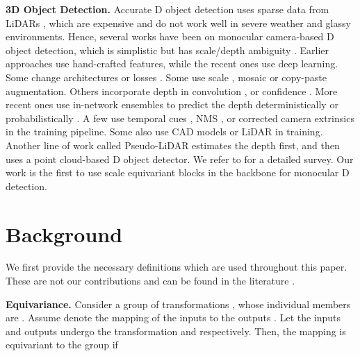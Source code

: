 \documentclass[runningheads]{llncs}
\newcommand{\threeD}{D}
\newcommand{\lidar}{LiDAR}
\newcommand{\equivariant} {equivariant}
\newcommand{\Equivariance}{Equivariance}
\newcommand{\scaleEquivariant} {scale \equivariant}
\newcommand{\pseudoLidar}{Pseudo-{\lidar}}
\newcommand{\noIndentHeading}[1]{\noindent\textbf{#1}}
\begin{document}
\noIndentHeading{3D Object Detection.}
        Accurate \threeD{} object detection uses sparse data from \lidar{}s \cite{shi2019pointrcnn}, which are expensive and do not work well in severe weather \cite{tang2020center3d} and glassy environments. 
        Hence, several works have been on monocular camera-based \threeD{} object detection, which is simplistic  but has scale/depth ambiguity \cite{tang2020center3d}.
        Earlier approaches \cite{payet2011contours, fidler20123d, pepik2015multi, chen2016monocular} use hand-crafted features, while the recent ones use deep learning.
        Some change architectures \cite{liu2019deep,li2020rtm3d,tang2020center3d,liu2022learning} or losses \cite{brazil2019m3d,chen2020monopair}. 
        Some use scale \cite{simonelli2020towards, lu2021geometry}, mosaic \cite{sugirtha2021exploring} or copy-paste \cite{lian2021geometry} augmentation.
        Others incorporate depth in convolution \cite{brazil2019m3d, ding2020learning}, or confidence \cite{kumar2020luvli, liu2019deep,brazil2020kinematic}. 
        More recent ones use in-network ensembles to predict the depth deterministically \cite{zhang2021objects} or probabilistically \cite{lu2021geometry}.
        A few use temporal cues \cite{brazil2020kinematic}, NMS \cite{kumar2021groomed}, or corrected camera extrinsics \cite{zhou2021monoef} in the training pipeline.
        Some also use CAD models \cite{chabot2017deep, liu2021autoshape} or \lidar{} \cite{reading2021categorical} in training.
        Another line of work called \pseudoLidar{} \cite{wang2019pseudo, ma2019accurate,ma2020rethinking,simonelli2021we,park2021pseudo} estimates the depth first, and then uses a point cloud-based \threeD{} object detector.
        We refer to \cite{ma20223d} for a detailed survey.
        Our work is the first to use \scaleEquivariant{} 
        blocks in the backbone for monocular \threeD{} detection.



\section{Background}
    We first provide the necessary definitions which are used throughout this paper. These are not our contributions and can be found in the literature \cite{worrall2018cubenet, burns1992non, hartley2003multiple}.
    
\noIndentHeading{\Equivariance.} 
        Consider a group of transformations , whose individual members are . 
        Assume  denote the mapping of the inputs  to the outputs . 
        Let the inputs and outputs undergo the transformation  and  respectively. 
        Then, the mapping  is equivariant to the group \cite{worrall2018cubenet} if
            
\end{document}
